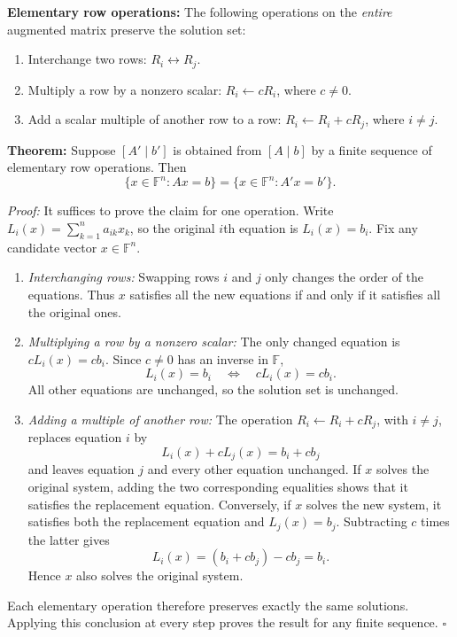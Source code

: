 \documentclass[a4paper,11pt,abstract=true]{scrartcl}
\theoremstyle{dotlessP}
\theoremstyle{dotlessS}
\theoremstyle{remark}
\theoremstyle{definition}
\begin{document}
\begin{claim_box}
\textbf{Elementary row operations:} The following operations on
the \emph{entire} augmented matrix preserve the solution set:
\begin{enumerate}
    \item Interchange two rows: $R_i\leftrightarrow R_j$.
    \item Multiply a row by a nonzero scalar:
    $R_i\leftarrow cR_i$, where $c\neq0$.
    \item Add a scalar multiple of another row to a row:
    $R_i\leftarrow R_i+cR_j$, where $i\neq j$.
\end{enumerate}
\end{claim_box}

\begin{problem_box}
\textbf{Theorem:} Suppose
$[A'\mid b']$ is obtained from $[A\mid b]$ by a finite sequence of
elementary row operations. Then
\[
\{x\in\mathbb{F}^n:Ax=b\}
=\{x\in\mathbb{F}^n:A'x=b'\}.
\]

\end{problem_box}

\begin{claim_box}
\textit{Proof:} It suffices to prove the claim for one operation.
Write $L_i(x)=\sum_{k=1}^n a_{ik}x_k$, so the original $i$th
equation is $L_i(x)=b_i$. Fix any candidate vector $x\in\mathbb{F}^n$.
\begin{enumerate}
    \item \emph{Interchanging rows:} Swapping rows $i$ and $j$ only
    changes the order of the equations. Thus $x$ satisfies all the
    new equations if and only if it satisfies all the original ones.
    \item \emph{Multiplying a row by a nonzero scalar:} The only
    changed equation is $cL_i(x)=cb_i$. Since $c\neq0$ has an inverse
    in $\mathbb{F}$,
    \[
    L_i(x)=b_i\quad\Longleftrightarrow\quad cL_i(x)=cb_i.
    \]
    All other equations are unchanged, so the solution set is unchanged.
    \item \emph{Adding a multiple of another row:} The operation
    $R_i\leftarrow R_i+cR_j$, with $i\neq j$, replaces equation $i$ by
    \[
    L_i(x)+cL_j(x)=b_i+cb_j
    \]
    and leaves equation $j$ and every other equation unchanged.
    If $x$ solves the original system, adding the two corresponding
    equalities shows that it satisfies the replacement equation.
    Conversely, if $x$ solves the new system, it satisfies both the
    replacement equation and $L_j(x)=b_j$. Subtracting $c$ times the
    latter gives
    \[
    L_i(x)=(b_i+cb_j)-cb_j=b_i.
    \]
    Hence $x$ also solves the original system.
\end{enumerate}
Each elementary operation therefore preserves exactly the same
solutions. Applying this conclusion at every step proves the result
for any finite sequence. \hfill$\square$
\end{claim_box}
\end{document}
